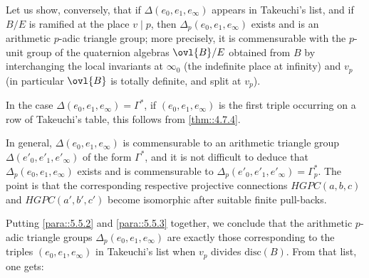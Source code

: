 \begin{para}\label{para::5.5.3} Let us show, conversely, that if
 $\Delta(e_0,e_1,e_\infty)$ appears in Takeuchi's list, and if $B/E$ is
ramified at the place $v\mid p$, then $\Delta_p(e_0,e_1,e_\infty)$
exists and is an arithmetic $p$-adic triangle group; more precisely, it
is commensurable with the $p$-unit group of the quaternion algebras
$\ovl{B}/E$ obtained from $B$ by interchanging the local invariants at
$\infty_0$ (the indefinite place at infinity) and $v_p$ (in particular
$\ovl{B}$ is totally definite, and split at $v_p$).
 
 In the case $\Delta(e_0,e_1,e_\infty)=\Gamma^\ast$, \ie if
 $(e_0,e_1,e_\infty)$ is the first triple occurring on a row of 
 Takeuchi's table, this follows from \ref{thm::4.7.4}.     

 In general, $\Delta(e_0,e_1,e_\infty)$ is commensurable to an arithmetic
 triangle group $\Delta(e'_0,e'_1,e'_\infty)$ of the form $\Gamma^\ast$,
 and it is not difficult to deduce that $\Delta_p(e_0,e_1,e_\infty)$
 exists and is commensurable to
 $\Delta_p(e'_0,e'_1,e'_\infty)=\Gamma_p^\ast$. The point is that the
 corresponding respective projective connections $HGPC(a,b,c)$ and
 $HGPC(a',b',c')$ become isomorphic after suitable finite pull-backs.
\end{para}

\begin{para}\label{para::5.5.4} Putting \ref{para::5.5.2} and
 \ref{para::5.5.3} together, we conclude 
 that the arithmetic $p$-adic triangle groups
 $\Delta_p(e_0,e_1,e_\infty)$ are exactly those corresponding to the
 triples $(e_0,e_1,e_\infty)$ in Takeuchi's list when $v_p$ divides
 $\mathrm{disc}(B)$.  From that list, one gets:
\end{para}

